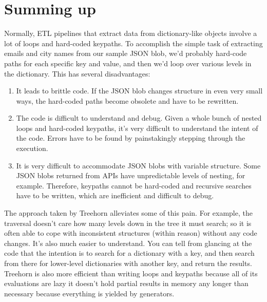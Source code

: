 \documentclass[letterpaper,10pt,english]{sphinxmanual}
\begin{document}
\section{Summing up}
\label{\detokenize{treehorn:summing-up}}
Normally, ETL pipelines that extract data from dictionary-like objects involve a lot of loops and hard-coded keypaths. To accomplish the simple task of extracting emails and city names from our sample JSON blob, we’d probably hard-code paths for each specific key and value, and then we’d loop over various levels in the dictionary. This has several disadvantages:
\begin{enumerate}
\def\theenumi{\arabic{enumi}}
\def\labelenumi{\theenumi .}
\makeatletter\def\p@enumii{\p@enumi \theenumi .}\makeatother
\item {} 
It leads to brittle code. If the JSON blob changes structure in even very small ways, the hard-coded paths become obsolete and have to be rewritten.

\item {} 
The code is difficult to understand and debug. Given a whole bunch of nested loops and hard-coded keypaths, it’s very difficult to understand the intent of the code. Errors have to be found by painstakingly stepping through the execution.

\item {} 
It is very difficult to accommodate JSON blobs with variable structure. Some JSON blobs returned from APIs have unpredictable levels of nesting, for example. Therefore, keypaths cannot be hard-coded and recursive searches have to be written, which are inefficient and difficult to debug.

\end{enumerate}

The approach taken by Treehorn alleviates some of this pain. For example, the  traversal doesn’t care how many levels down in the tree it must search; so it is often able to cope with inconsistent structures (within reason) without any code changes. It’s also much easier to understand. You can tell from glancing at the code that the intention is to search for a dictionary with a key, and then search from there for lower-level dictionaries with another key, and return the results. Treehorn is also more efficient than writing loops and keypaths because all of its evaluations are lazy \textendash{} it doesn’t hold partial results in memory any longer than necessary because everything is yielded by generators.
\end{document}
